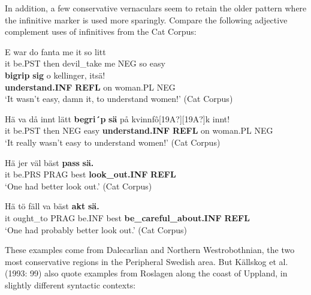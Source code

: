 
In addition, a few conservative vernaculars seem to retain the older pattern where the infinitive marker is used more sparingly. Compare the following adjective complement uses of infinitives from the Cat Corpus:


\ea\label{}
\gll E  war  do  fanta  me  it  so  litt\\
it  be.PST  then  devil\_take  me  NEG  so  easy\\
\gll \textbf{bigrip} \textbf{sig} o  kellinger,  itsä!\\
\textbf{understand.INF} \textbf{REFL} on  woman.PL  NEG\\
\glt  ‘It wasn’t easy, damn it, to understand women!’ (Cat Corpus)
\z

\ea\label{}
\gll Hä  va  då  innt  lätt  \textbf{begri´p} \textbf{sä} på  kvinnfô[19A?][19A?]k  innt!\\
it  be.PST  then  NEG  easy  \textbf{understand.INF} \textbf{REFL} on  woman.PL  NEG\\
\glt ‘It really wasn’t easy to understand women!’ (Cat Corpus)
\z

\ea\label{}
\gll Hä  jer  väl  bäst  \textbf{pass} \textbf{sä.}\\
it  be.PRS  PRAG  best  \textbf{look\_out.INF} \textbf{REFL}\\
\glt ‘One had better look out.’ (Cat Corpus)
\z

\ea\label{}
\gll Hä  tö  fäll  va  bäst  \textbf{akt}\textbf{  sä.}\\
it  ought\_to  PRAG  be.INF  best  \textbf{be\_careful\_about.INF} \textbf{REFL}\\
\glt ‘One had probably better look out.’ (Cat Corpus)
\z

These examples come from Dalecarlian and Northern Westrobothnian, the two most conservative regions in the Peripheral Swedish area. But Källskog et al. (1993: 99) also quote examples from Roslagen along the coast of Uppland, in slightly different syntactic contexts:


